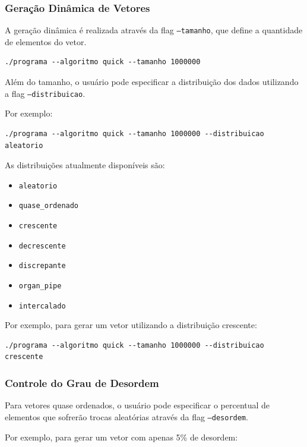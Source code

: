 \documentclass{article}
\begin{document}
\subsubsection{Geração Dinâmica de Vetores}

A geração dinâmica é realizada através da flag \texttt{--tamanho}, que define a quantidade de elementos do vetor.

\begin{verbatim}
./programa --algoritmo quick --tamanho 1000000
\end{verbatim}

Além do tamanho, o usuário pode especificar a distribuição dos dados utilizando a flag \texttt{--distribuicao}.

Por exemplo:

\begin{verbatim}
./programa --algoritmo quick --tamanho 1000000 --distribuicao aleatorio
\end{verbatim}

As distribuições atualmente disponíveis são:

\begin{itemize}
    \item \texttt{aleatorio}
    \item \texttt{quase\_ordenado}
    \item \texttt{crescente}
    \item \texttt{decrescente}
    \item \texttt{discrepante}
    \item \texttt{organ\_pipe}
    \item \texttt{intercalado}
\end{itemize}

Por exemplo, para gerar um vetor utilizando a distribuição crescente:

\begin{verbatim}
./programa --algoritmo quick --tamanho 1000000 --distribuicao crescente
\end{verbatim}

\subsubsection{Controle do Grau de Desordem}

Para vetores quase ordenados, o usuário pode especificar o percentual de elementos que sofrerão trocas aleatórias através da flag \texttt{--desordem}.

Por exemplo, para gerar um vetor com apenas 5\% de desordem:
\end{document}
